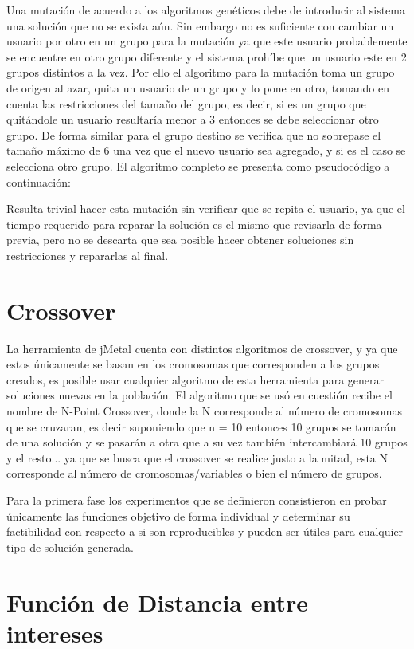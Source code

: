 Una mutación de acuerdo a los algoritmos genéticos debe de introducir al sistema una solución que no se exista aún. Sin embargo no es suficiente con cambiar un usuario por otro en un grupo para la mutación ya que este usuario probablemente se encuentre en otro grupo diferente y el sistema prohíbe que un usuario este en 2 grupos distintos a la vez. Por ello el algoritmo para la mutación toma un grupo de origen al azar, quita un usuario de un grupo y lo pone en otro, tomando en cuenta las restricciones del tamaño del grupo, es decir, si es un grupo que quitándole un usuario resultaría menor a 3 entonces se debe seleccionar otro grupo. De forma similar para el grupo destino se verifica que no sobrepase el tamaño máximo de 6 una vez que el nuevo usuario sea agregado, y si es el caso se selecciona otro grupo. El algoritmo completo se presenta como pseudocódigo a continuación:

Resulta trivial hacer esta mutación sin verificar que se repita el usuario, ya que el tiempo requerido para reparar la solución es el mismo que revisarla de forma previa, pero no se descarta que sea posible hacer obtener soluciones sin restricciones y repararlas al final.

\section{Crossover}

La herramienta de jMetal cuenta con distintos algoritmos de crossover, y ya que estos únicamente se basan en los cromosomas que corresponden a los grupos creados, es posible usar cualquier algoritmo de esta herramienta para generar soluciones nuevas en la población. El algoritmo que se usó en cuestión recibe el nombre de N-Point Crossover, donde la N corresponde al número de cromosomas que se cruzaran, es decir suponiendo que n = 10 entonces 10 grupos se tomarán de una solución y se pasarán a otra que a su vez también intercambiará 10 grupos y el resto... ya que se busca que el crossover se realice justo a la mitad, esta N corresponde al número de cromosomas/variables o bien el número de grupos.

Para la primera fase los experimentos que se definieron consistieron en probar únicamente las funciones objetivo de forma individual y determinar su factibilidad con respecto a si son reproducibles y pueden ser útiles para cualquier tipo de solución generada.

\section{Función de Distancia entre intereses}

